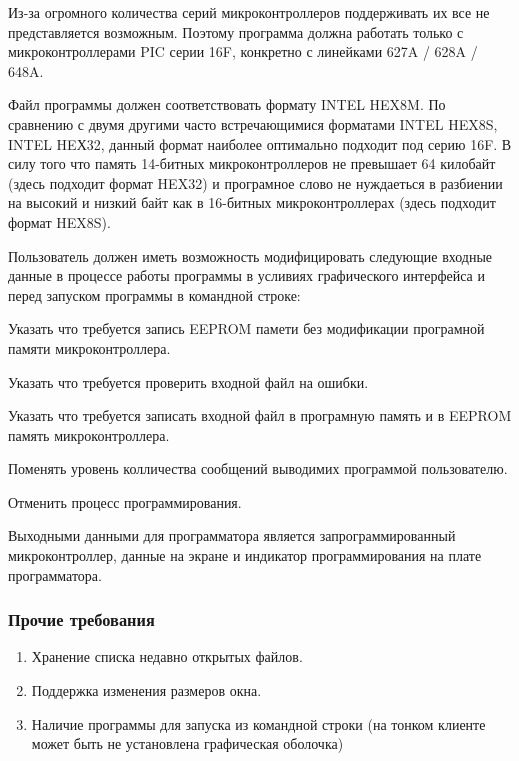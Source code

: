 \begin{my_enumerate}
\item Из-за огромного количества серий микроконтроллеров поддерживать их все не представляется возможным. Поэтому программа должна работать только с микроконтроллерами PIC серии 16F, конкретно с линейками 627A / 628A / 648A.
\item Файл программы должен соответствовать формату INTEL HEX8M. По сравнению с двумя другими часто встречающимися форматами INTEL HEX8S, INTEL HEХ32, данный формат наиболее оптимально подходит под серию 16F. В силу того что память 14-битных микроконтроллеров не превышает 64 килобайт (здесь подходит формат HEX32) и програмное слово не нуждаеться в разбиении на высокий и низкий байт как в 16-битных микроконтроллерах (здесь подходит формат HEX8S).
\item Пользователь должен иметь возможность модифицировать следующие входные данные в процессе работы программы в усливиях графического интерфейса и перед запуском программы в командной строке:
\begin{my_enumerate}
\item Указать что требуется запись EEPROM памети без модификации програмной памяти микроконтроллера.
\item Указать что требуется проверить входной файл на ошибки.
\item Указать что требуется записать входной файл в програмную память и в EEPROM память микроконтроллера.
\item Поменять уровень колличества сообщений выводимих программой пользователю.
\item Отменить процесс программирования.
\end{my_enumerate}
\end{my_enumerate}

\medskip
Выходными данными для программатора является запрограммированный микроконтроллер, данные на экране и индикатор программирования на плате программатора.


\subsubsection{Прочие требования}
\begin{enumerate}
\item Хранение списка недавно открытых файлов.
\item Поддержка изменения размеров окна.
\item Наличие программы для запуска из командной строки (на тонком клиенте может быть не установлена графическая оболочка)
\end{enumerate}

